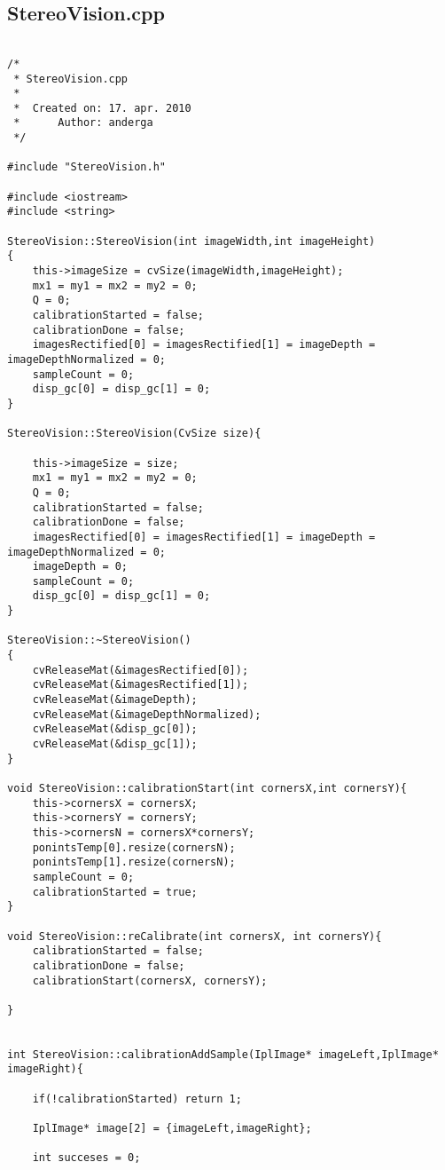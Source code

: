 \subsection{StereoVision.cpp}

\begin{lstlisting}

/*
 * StereoVision.cpp
 *
 *  Created on: 17. apr. 2010
 *      Author: anderga
 */

#include "StereoVision.h"

#include <iostream>
#include <string>

StereoVision::StereoVision(int imageWidth,int imageHeight)
{
    this->imageSize = cvSize(imageWidth,imageHeight);
    mx1 = my1 = mx2 = my2 = 0;
    Q = 0;
    calibrationStarted = false;
    calibrationDone = false;
    imagesRectified[0] = imagesRectified[1] = imageDepth = imageDepthNormalized = 0;
    sampleCount = 0;
    disp_gc[0] = disp_gc[1] = 0;
}

StereoVision::StereoVision(CvSize size){

	this->imageSize = size;
	mx1 = my1 = mx2 = my2 = 0;
	Q = 0;
	calibrationStarted = false;
	calibrationDone = false;
	imagesRectified[0] = imagesRectified[1] = imageDepth = imageDepthNormalized = 0;
	imageDepth = 0;
	sampleCount = 0;
	disp_gc[0] = disp_gc[1] = 0;
}

StereoVision::~StereoVision()
{
    cvReleaseMat(&imagesRectified[0]);
    cvReleaseMat(&imagesRectified[1]);
    cvReleaseMat(&imageDepth);
    cvReleaseMat(&imageDepthNormalized);
    cvReleaseMat(&disp_gc[0]);
    cvReleaseMat(&disp_gc[1]);
}

void StereoVision::calibrationStart(int cornersX,int cornersY){
    this->cornersX = cornersX;
    this->cornersY = cornersY;
    this->cornersN = cornersX*cornersY;
    ponintsTemp[0].resize(cornersN);
    ponintsTemp[1].resize(cornersN);
    sampleCount = 0;
    calibrationStarted = true;
}

void StereoVision::reCalibrate(int cornersX, int cornersY){
	calibrationStarted = false;
	calibrationDone = false;
	calibrationStart(cornersX, cornersY);

}


int StereoVision::calibrationAddSample(IplImage* imageLeft,IplImage* imageRight){

    if(!calibrationStarted) return 1;

    IplImage* image[2] = {imageLeft,imageRight};

    int succeses = 0;


\end{lstlisting}
